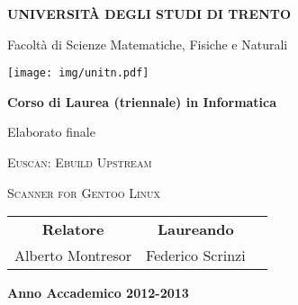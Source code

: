 \begin{titlepage}
  \pagestyle{empty}

  \begin{center}
    {\bfseries
      \Large {\huge U}NIVERSIT\`A DEGLI {\huge S}TUDI DI {\huge T}RENTO}

    \vspace{0.2cm}

    {\Large Facolt\`a di Scienze Matematiche, Fisiche e Naturali}

    \vspace{0.5cm}

    \begin{center}
      \texttt{[image: img/unitn.pdf]}
    \end{center}

    \vspace{0.5cm}

    {\bfseries \Large Corso di Laurea (triennale) in Informatica}

    \vspace{0.3cm}

    {\Large Elaborato finale}

    \vspace{2.5cm}

    {\huge \textsc{Euscan: Ebuild Upstream}\\}

    \vspace{0.2cm}

    {\huge \textsc{Scanner for Gentoo Linux}}

    \vspace{3.0cm}


    \large
    \begin{center}
      \begin{tabular}{ccc}
        {\bfseries Relatore} &
        \hspace{5cm}
        {\bfseries Laureando} \\

        Alberto Montresor &
        \hspace{5cm} Federico Scrinzi \\


      \end{tabular}
    \end{center}
    \vspace{3cm}

    {\bfseries \large Anno Accademico 2012-2013}
    \vfill
  \end{center}
\end{titlepage}